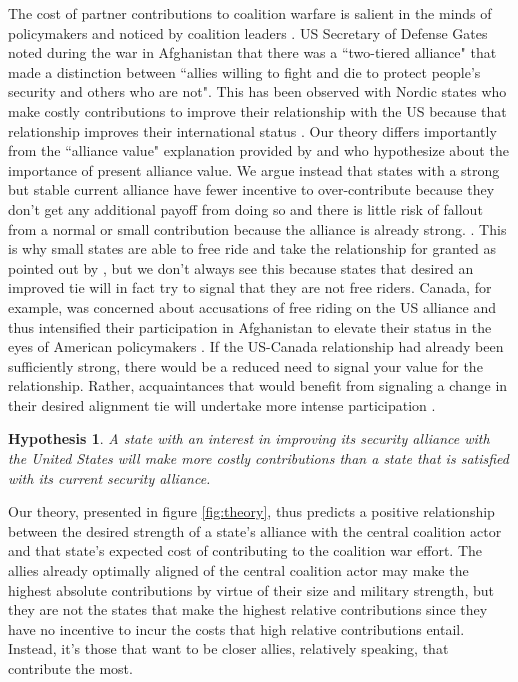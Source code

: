 \documentclass[12pt,letterpaper]{article}
\newtheorem{hyp}{Hypothesis}
\begin{document}
		The cost of partner contributions to coalition warfare is salient in the minds of policymakers and noticed by coalition leaders \citep[328]{ringsmose_natoburdensharingredux_2010}. US Secretary of Defense Gates noted during the war in Afghanistan that there was a ``two-tiered alliance" that made a distinction between ``allies willing to fight and die to protect people's security and others who are not". This has been observed with Nordic states who make costly contributions to improve their relationship with the US because that relationship improves their international status \citep{pedersen_bandwagonstatuschanging_2018}. Our theory differs importantly from the ``alliance value" explanation provided by \citet{davidson_americaallieswar_2011} and \citet{massie_democraticalliesfollowership_2016} who hypothesize about the importance of present alliance value. We argue instead that states with a strong but stable current alliance have fewer incentive to over-contribute because they don't get any additional payoff from doing so and there is little risk of fallout from a normal or small contribution because the alliance is already strong. \citep{davidson_headingexitsdemocratic_2014}. This is why small states are able to free ride and take the relationship for granted as pointed out by \citet{keohane_biginfluencesmall_1971}, but we don't always see this because states that desired an improved tie will in fact try to signal that they are not free riders. Canada, for example, was concerned about accusations of free riding on the US alliance and thus intensified their participation in Afghanistan to elevate their status in the eyes of American policymakers \citep{massie_alliancevaluestatus_2018}. If the US-Canada relationship had already been sufficiently strong, there would be a reduced need to signal your value for the relationship. Rather, acquaintances that would benefit from signaling a change in their desired alignment tie will undertake more intense participation \citep{gartzke_contractsfriendsalliances_2012, gibler_priorcommitmentscompatible_2004}.

		\begin{hyp}
			A state with an interest in improving its security alliance with the United States will make more costly contributions than a state that is satisfied with its current security alliance.
		\end{hyp}

		Our theory, presented in figure \ref{fig:theory}, thus predicts a positive relationship between the desired strength of a state's alliance with the central coalition actor and that state's expected cost of contributing to the coalition war effort. The allies already optimally aligned of the central coalition actor may make the highest absolute contributions by virtue of their size and military strength, but they are not the states that make the highest relative contributions since they have no incentive to incur the costs that high relative contributions entail. Instead, it's those that want to be closer allies, relatively speaking, that contribute the most.
\end{document}
